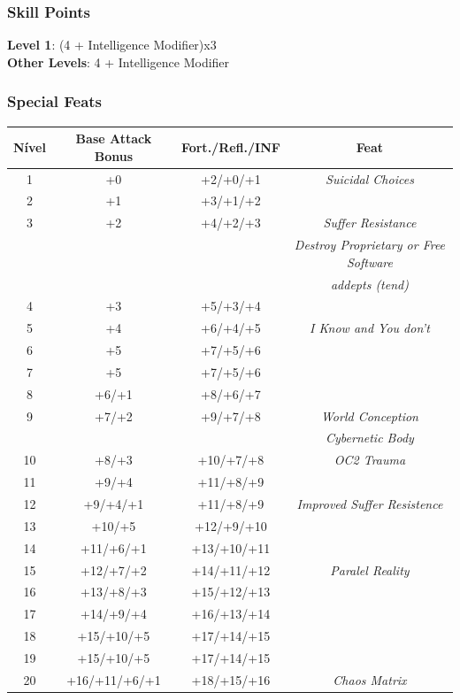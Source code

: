 \documentclass[ letterpaper,12pt]{article}
\begin{document}
\subsubsection{Skill Points}
{\bf Level 1}: (4 + Intelligence Modifier)x3\\
{\bf Other Levels}: 4 + Intelligence Modifier\\

\subsubsection{Special Feats}

\begin{center} \begin{tabular}{|c||c|c|c|}
\hline
{\bf Nível}&{\bf Base Attack Bonus}&{\bf Fort./Refl./INF}&{\bf Feat}\\
\hline
1&+0&+2/+0/+1&{\it Suicidal Choices}\\
\hline
2&+1&+3/+1/+2&\\
\hline
3&+2&+4/+2/+3&{\it Suffer Resistance}\\
&&&{\it Destroy Proprietary or Free Software}\\
&&&{\it addepts (tend)}\\
\hline
4&+3&+5/+3/+4&\\
\hline
5&+4&+6/+4/+5&{\it I Know and You don't}\\
\hline
6&+5&+7/+5/+6&\\
\hline
7&+5&+7/+5/+6&{}\\
\hline
8&+6/+1&+8/+6/+7&\\
\hline
9&+7/+2&+9/+7/+8&{\it World Conception}\\
&&&{\it Cybernetic Body}\\
\hline
10&+8/+3&+10/+7/+8&{\it OC2 Trauma}\\
\hline
11&+9/+4&+11/+8/+9&\\
\hline
12&+9/+4/+1&+11/+8/+9&{\it Improved Suffer Resistence}\\
\hline
13&+10/+5&+12/+9/+10&\\
\hline
14&+11/+6/+1&+13/+10/+11&\\
\hline
15&+12/+7/+2&+14/+11/+12&{\it Paralel Reality}\\
\hline
16&+13/+8/+3&+15/+12/+13&\\
\hline
17&+14/+9/+4&+16/+13/+14&\\
\hline
18&+15/+10/+5&+17/+14/+15&\\
\hline
19&+15/+10/+5&+17/+14/+15&\\
\hline
20&+16/+11/+6/+1&+18/+15/+16&{\it Chaos Matrix}\\
\hline
\end{tabular} \end{center}
\end{document}
